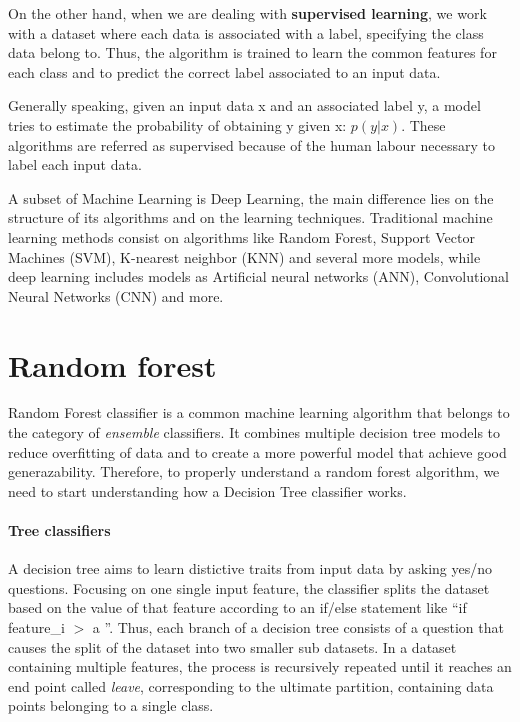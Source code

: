 \documentclass[11pt]{report}
\begin{document}
On the other hand, when we are dealing with \textbf{supervised learning}, we work with a dataset where each data is associated with a label, specifying the class data belong to.
Thus, the algorithm is trained to learn the common features for each class and to predict the correct label associated to an input data.

Generally speaking, given an input data x and an associated label y, a model tries to estimate the probability of obtaining y given x: $p(y|x)$.
These algorithms are referred as supervised because of the human labour necessary to label each input data.

A subset of Machine Learning is Deep Learning, the main difference lies on the structure of its algorithms and on the learning techniques.
Traditional machine learning methods consist on algorithms like Random Forest, Support Vector Machines (SVM), K-nearest neighbor (KNN) and several more models, while deep learning includes models as Artificial neural networks (ANN), Convolutional Neural Networks (CNN) and more.


\section{Random forest}
Random Forest classifier is a common machine learning algorithm that belongs to the category of \emph{ensemble} classifiers.
It combines multiple decision tree models to reduce overfitting of data and to create a more powerful model that achieve good generazability.
Therefore, to properly understand a random forest algorithm, we need to start understanding how a Decision Tree classifier works.

\paragraph{Tree classifiers} \hfill

\noindent A decision tree aims to learn distictive traits from input data by asking yes/no questions.
Focusing on one single input feature, the classifier splits the dataset based on the value of that feature according to an if/else statement like \textquotedblleft if feature\_i $>$ a \textquotedblright.
Thus, each branch of a decision tree consists of a question that causes the split of the dataset into two smaller sub datasets.
In a dataset containing multiple features, the process is recursively repeated until it reaches an end point called \emph{leave}, corresponding to the ultimate partition, containing data points belonging to a single class.
\end{document}
